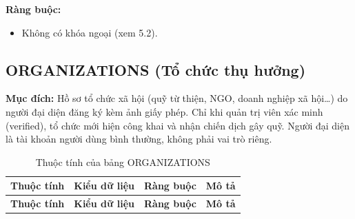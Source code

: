 \textbf{Ràng buộc:}
\begin{itemize}
    \item Không có khóa ngoại (xem 5.2).
\end{itemize}

\subsection{ORGANIZATIONS (Tổ chức thụ hưởng)}

\textbf{Mục đích:} Hồ sơ tổ chức xã hội (quỹ từ thiện, NGO, doanh nghiệp xã hội\ldots{}) do người đại diện đăng ký kèm ảnh giấy phép. Chỉ khi quản trị viên xác minh (verified), tổ chức mới hiện công khai và nhận chiến dịch gây quỹ. Người đại diện là tài khoản người dùng bình thường, không phải vai trò riêng.

{\small
\begin{longtable}{|P{3.2cm}|P{2.8cm}|P{2.2cm}|p{5.4cm}|}
    \caption{Thuộc tính của bảng ORGANIZATIONS}
    \label{tab:organizations} \\
    \hline
    \textbf{Thuộc tính} & \textbf{Kiểu dữ liệu} & \textbf{Ràng buộc} & \textbf{Mô tả} \\
    \hline
    \endfirsthead
    \hline
    \textbf{Thuộc tính} & \textbf{Kiểu dữ liệu} & \textbf{Ràng buộc} & \textbf{Mô tả} \\
    \hline
    \endhead


\end{longtable}}
